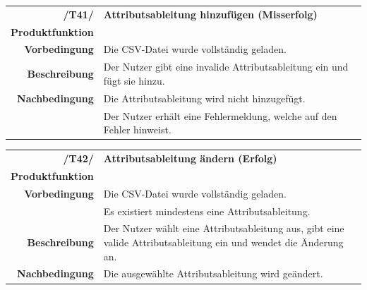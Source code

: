 \documentclass{article}
\begin{document}
\begin{table}[H]
\begin{tabularx}{\textwidth}{rX}
 \vspace{1mm}
\textbf{/T41/}         & \textbf{Attributsableitung hinzufügen (Misserfolg)} \\ \vspace{1mm}
\textbf{Produktfunktion} & \nameref{sec:f:Attributsableitung hinzufügen} \\ \vspace{1mm}
\textbf{Vorbedingung}  & Die CSV-Datei wurde vollständig geladen.   \\ \vspace{1mm}
\textbf{Beschreibung}  & Der Nutzer gibt eine invalide Attributsableitung ein und fügt sie hinzu. \\
\textbf{Nachbedingung} & Die Attributsableitung wird nicht hinzugefügt. \\ & Der Nutzer erhält eine Fehlermeldung, welche auf den Fehler hinweist.
\end{tabularx}
\end{table}

\begin{table}[H]
\begin{tabularx}{\textwidth}{rX}
 \vspace{1mm}
\textbf{/T42/}         & \textbf{Attributsableitung ändern (Erfolg)} \\ \vspace{1mm}
\textbf{Produktfunktion} & \nameref{sec:f:Attributsableitung ändern} \\
\textbf{Vorbedingung}  & Die CSV-Datei wurde vollständig geladen. \\ \vspace{1mm} & Es existiert mindestens eine Attributsableitung.  \\ \vspace{1mm}
\textbf{Beschreibung}  & Der Nutzer wählt eine Attributsableitung aus, gibt eine valide Attributsableitung ein und wendet die Änderung an. \\
\textbf{Nachbedingung} & Die ausgewählte Attributsableitung wird geändert.
\end{tabularx}
\end{table}
\end{document}

